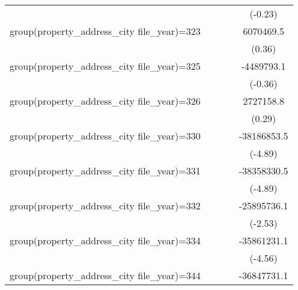 {\begin{tabular}{l*{4}{c}}
                    &                     &                     &                     &     (-0.23)         \\
\addlinespace
group(property\_address\_city file\_year)=323&                     &                     &                     &   6070469.5         \\
                    &                     &                     &                     &      (0.36)         \\
\addlinespace
group(property\_address\_city file\_year)=325&                     &                     &                     &  -4489793.1         \\
                    &                     &                     &                     &     (-0.36)         \\
\addlinespace
group(property\_address\_city file\_year)=326&                     &                     &                     &   2727158.8         \\
                    &                     &                     &                     &      (0.29)         \\
\addlinespace
group(property\_address\_city file\_year)=330&                     &                     &                     & -38186853.5\sym{***}\\
                    &                     &                     &                     &     (-4.89)         \\
\addlinespace
group(property\_address\_city file\_year)=331&                     &                     &                     & -38358330.5\sym{***}\\
                    &                     &                     &                     &     (-4.89)         \\
\addlinespace
group(property\_address\_city file\_year)=332&                     &                     &                     & -25895736.1\sym{*}  \\
                    &                     &                     &                     &     (-2.53)         \\
\addlinespace
group(property\_address\_city file\_year)=334&                     &                     &                     & -35861231.1\sym{***}\\
                    &                     &                     &                     &     (-4.56)         \\
\addlinespace
group(property\_address\_city file\_year)=344&                     &                     &                     & -36847731.1\sym{***}\\

\end{tabular}}

